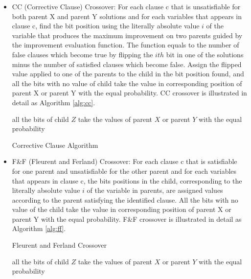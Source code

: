 \begin{itemize}
	\item
	      CC (Corrective Clause) Crossover: For each clause c that is unsatisfiable for
	      both parent X and parent Y solutions and for each variables that appears in
	      clause c, find the bit position using the literally absolute value
	      $i$ of the variable that produces the maximum improvement on
	      two parents guided by the improvement evaluation function. The function equals
	      to the number of false clauses which become true by flipping the
	      $ith$ bit in one of the solutions minus the number of
	      satisfied clauses which become false. Assign the flipped value applied to one
	      of the parents to the child in the bit position found, and all the bits with
	      no value of child take the value in corresponding position of parent X or
	      parent Y with the equal probability. CC crossover is illustrated in detail as Algorithm \ref{alg:cc}.
		\begin{algorithm}
		\SetAlgoLined
		\BlankLine
			all the bits of child $Z$ take the values of parent $X$ or parent $Y$ with the equal probability\;
		\caption{Corrective Clause Algorithm}
		\label{alg:cc} 
		\end{algorithm}
	\item
	      F\&F (Fleurent and Ferland) Crossover: For each clause c that is satisfiable
	      for one parent and unsatisfiable for the other parent and for each variables
	      that appears in clause c, the bits positions in the child, corresponding to
	      the literally absolute value $i$ of the variable in parents,
	      are assigned values according to the parent satisfying the identified clause.
	      All the bits with no value of the child take the value in corresponding
	      position of parent X or parent Y with the equal probability. F\&F crossover is illustrated in detail as Algorithm \ref{alg:ff}.
		  \begin{algorithm}
			\SetAlgoLined
			\caption{Fleurent and Ferland Crossover}
			\label{alg:ff} 
			\KwData{two parents $X$ and $Y$}
			\KwResult{one child $Z$}
			\BlankLine
			  all the bits of child $Z$ take the values of parent $X$ or parent $Y$ with the equal probability\;

\end{algorithm}
\end{itemize}
